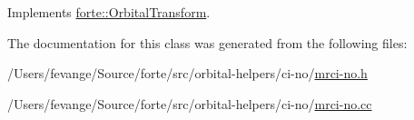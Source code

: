 Implements \mbox{\hyperlink{classforte_1_1_orbital_transform_aeb179f5b68883cf346dde354c05fd27b}{forte\+::\+Orbital\+Transform}}.



The documentation for this class was generated from the following files\+:\begin{DoxyCompactItemize}
\item 
/\+Users/fevange/\+Source/forte/src/orbital-\/helpers/ci-\/no/\mbox{\hyperlink{mrci-no_8h}{mrci-\/no.\+h}}\item 
/\+Users/fevange/\+Source/forte/src/orbital-\/helpers/ci-\/no/\mbox{\hyperlink{mrci-no_8cc}{mrci-\/no.\+cc}}\end{DoxyCompactItemize}
